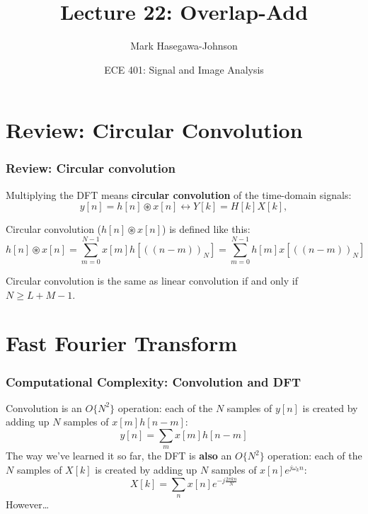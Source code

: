 \documentclass{beamer}
\title{Lecture 22: Overlap-Add}
\author{Mark Hasegawa-Johnson}
\date{ECE 401: Signal and Image Analysis}
\begin{document}
\begin{frame}
  \maketitle
\end{frame}

\begin{frame}
  \tableofcontents
\end{frame}

\section[Review]{Review: Circular Convolution}
\setcounter{subsection}{1}

\begin{frame}
  \frametitle{Review: Circular convolution}

  Multiplying the DFT means {\bf circular convolution} of the time-domain signals:
  \begin{displaymath}
    y[n]=h[n]\circledast x[n] \leftrightarrow Y[k] = H[k]X[k],
  \end{displaymath}
  
  Circular convolution ($h[n]\circledast x[n]$) is defined like this:
  \begin{displaymath}
    h[n]\circledast x[n] = \sum_{m=0}^{N-1}x[m]h\left[(\!(n-m)\!)_N\right]
    = \sum_{m=0}^{N-1}h[m]x\left[(\!(n-m)\!)_N\right]
  \end{displaymath}

  Circular convolution is the same as linear convolution if and only if $N\ge L+M-1$.
\end{frame}

\section[FFT]{Fast Fourier Transform}
\setcounter{subsection}{1}

\begin{frame}
  \frametitle{Computational Complexity: Convolution and DFT}

  Convolution is an $O\{N^2\}$ operation: each of the $N$ samples of
  $y[n]$ is created by adding up $N$ samples of $x[m]h[n-m]$:
  \begin{displaymath}
    y[n] = \sum_m x[m] h[n-m]
  \end{displaymath}
  The way we've learned it so far, the DFT is {\bf also} an $O\{N^2\}$
  operation: each of the $N$ samples of $X[k]$ is created by adding up
  $N$ samples of $x[n]e^{j\omega_k n}$:
  \begin{displaymath}
    X[k] = \sum_n x[n] e^{-j\frac{2\pi kn}{N}}
  \end{displaymath}
  However\ldots
\end{frame}
\end{document}
